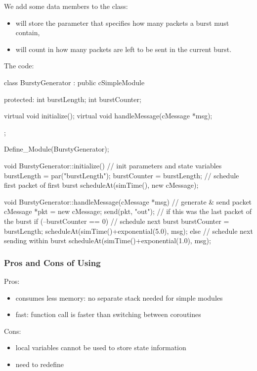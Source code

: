 We add some data members to the class:
\begin{itemize}
\item{ will store the parameter that specifies how many
    packets a burst must contain,}
\item{ will count in how many packets are left to be sent
    in the current burst.}
\end{itemize}

The code:

\begin{cpp}
class BurstyGenerator : public cSimpleModule
{
  protected:
    int burstLength;
    int burstCounter;

    virtual void initialize();
    virtual void handleMessage(cMessage *msg);
};

Define_Module(BurstyGenerator);

void BurstyGenerator::initialize()
{
    // init parameters and state variables
    burstLength = par("burstLength");
    burstCounter = burstLength;
    // schedule first packet of first burst
    scheduleAt(simTime(), new cMessage);
}

void BurstyGenerator::handleMessage(cMessage *msg)
{
    // generate & send packet
    cMessage *pkt = new cMessage;
    send(pkt, "out");
    // if this was the last packet of the burst
    if (--burstCounter == 0)
    {
        // schedule next burst
        burstCounter = burstLength;
        scheduleAt(simTime()+exponential(5.0), msg);
    }
    else
    {
        // schedule next sending within burst
        scheduleAt(simTime()+exponential(1.0), msg);
    }
}
\end{cpp}



\subsubsection{Pros and Cons of Using }


Pros:
\begin{itemize}
  \item{consumes less memory: no separate stack needed for simple modules}
  \item{fast: function call is faster than switching between coroutines}
\end{itemize}

Cons:
\begin{itemize}
  \item{local variables cannot be used to store state information}
  \item{need to redefine }
\end{itemize}


